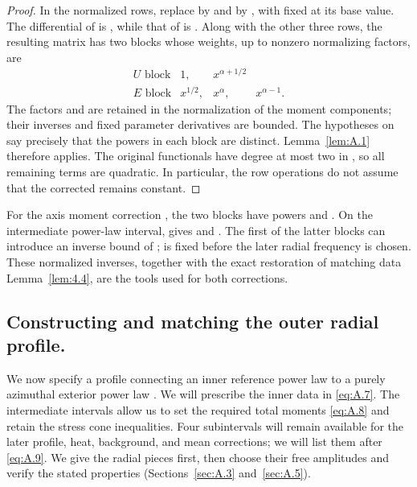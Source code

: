 \begin{proof}
In the normalized rows, replace  by
 and  by
, with  fixed at its base value. The
differential of  is
, while that of
 is
. Along with the other three rows, the resulting
matrix has two blocks whose weights, up to nonzero normalizing factors, are
\[
\begin{array}{c|ccc}
U\text{ block}&1,&x^{\alpha+1/2}&\\
E\text{ block}&x^{1/2},&x^\alpha,&x^{\alpha-1}.
\end{array}
\]
The factors  and  are retained in
the normalization of the moment components; their inverses and fixed parameter derivatives are
bounded. The hypotheses on  say precisely that the powers in each
block are distinct. Lemma~\ref{lem:A.1} therefore applies. The original functionals have degree at
most two in , so all remaining terms are quadratic. In particular, the
row operations do not assume that the corrected  remains constant.
\end{proof}

For the axis moment correction , the two blocks have powers
 and . On the
intermediate power-law interval,  gives
 and
. The first of the latter blocks can
introduce an inverse bound of ;
 is fixed before the later radial frequency is chosen. These
normalized inverses, together with the exact restoration of matching data Lemma~\ref{lem:4.4},
are the tools used for both corrections.

%
\subsection{Constructing and matching the outer radial profile.}\label{sec:A.2}
We now specify a profile connecting an inner reference power law to a purely azimuthal exterior
power law . We will prescribe the inner data in
\eqref{eq:A.7}. The intermediate intervals allow us to set the required total moments
\eqref{eq:A.8} and retain the stress cone inequalities. Four subintervals will remain available for
the later profile, heat, background, and mean corrections; we will list them after \eqref{eq:A.9}.
We give the radial pieces first, then choose their free amplitudes and verify the stated properties
(Sections~\ref{sec:A.3} and~\ref{sec:A.5}).

